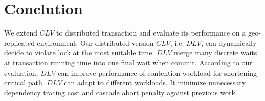 \documentclass[conference]{IEEEtran}
\begin{document}
\section{Conclution}
\label{sec:conclution}
We extend $CLV$ to distributed transaction and evaluate its performance on a geo-replicated environment.
Our distributed version ${CLV}$, i.e. ${DLV}$, can dynamically decide to violate lock at the most suitable time.
${DLV}$ merge many discrete waits at transaction running time into one final wait when commit.
According to our evaluation, ${DLV}$ can improve performance of contention workload for shortening critical path.
${DLV}$ can adapt to different workloads.
It minimize unnecessary dependency tracing cost and cascade abort penalty against previous work.








\end{document}
